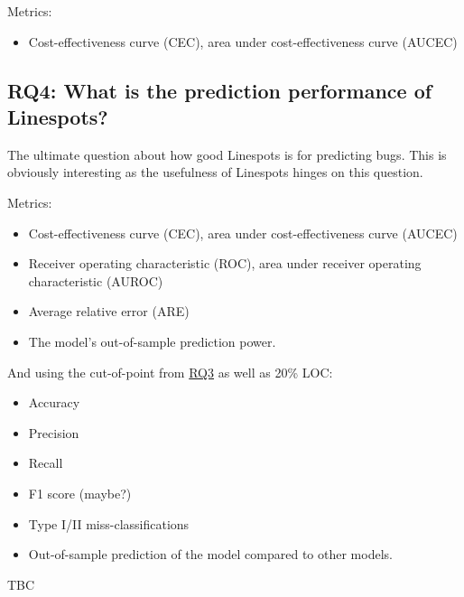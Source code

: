 Metrics:
\begin{itemize}
    \item Cost-effectiveness curve (CEC), area under cost-effectiveness curve (AUCEC)
\end{itemize}


\subsection*{RQ4: What is the prediction performance of Linespots?}
\label{sec:rq4}

The ultimate question about how good Linespots is for predicting bugs. This is obviously interesting as the usefulness of Linespots hinges on this question.

Metrics:
\begin{itemize}
    \item Cost-effectiveness curve (CEC), area under cost-effectiveness curve (AUCEC)
    \item Receiver operating characteristic (ROC), area under receiver operating characteristic (AUROC)
    \item {} Average relative error (ARE)
    \item The model's out-of-sample prediction power. %
\end{itemize}

And using the cut-of-point from \hyperref[sec:rq3]{RQ3} as well as 20\% LOC:
\begin{itemize}
    \item Accuracy
    \item Precision
    \item Recall
    \item F1 score (maybe?)
    \item Type I\slash II miss-classifications %
    \item Out-of-sample prediction of the model compared to other models. %
\end{itemize}

TBC